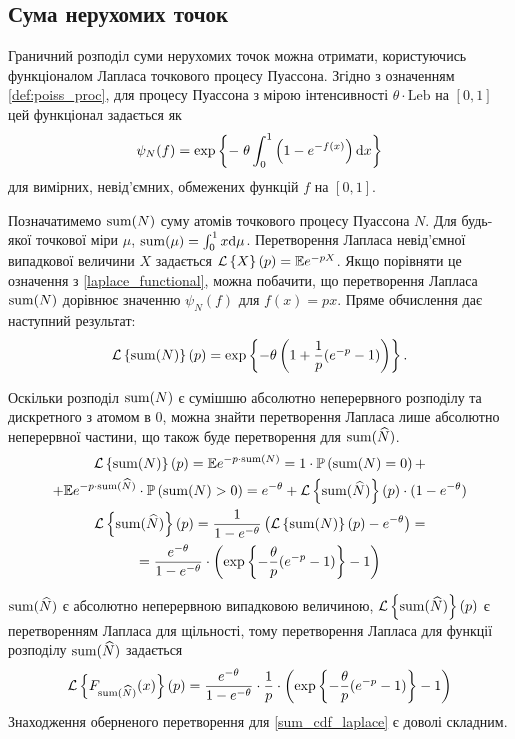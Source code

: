 \subsection{Сума нерухомих точок}
Граничний розподіл суми нерухомих точок можна отримати, користуючись функціоналом Лапласа точкового процесу Пуассона.
Згідно з означенням \ref{def:poiss_proc}, для процесу Пуассона з мірою інтенсивності 
$\theta \cdot \mathrm{Leb}$ на $[0, 1]$ цей функціонал задається як
\begin{equation}\label{laplace_functional}
    \psi_N(f) = \exp\left\{ - \; \theta \int_0^1 \left(1 - e^{-f(x)}\right) \mathrm{d} x\right\}
\end{equation}
для вимірних, невід'ємних, обмежених функцій $f$ на $[0, 1]$.

Позначатимемо $\operatorname{sum}(N)$ суму атомів точкового процесу Пуассона $N$. 
Для будь-якої точкової міри $\mu$, 
$\operatorname{sum}(\mu) = \int_0^1 x \mathrm{d}\mu$. 
Перетворення Лапласа невід'ємної випадкової величини $X$ задається
$\mathcal{L}\left\{X\right\}(p) = \mathbb{E} e^{-pX}$. 
Якщо порівняти це означення з \eqref{laplace_functional}, можна побачити, що
перетворення Лапласа $\operatorname{sum}(N)$ дорівнює значенню $\psi_N(f)$ для $f(x) = px$.
Пряме обчислення дає наступний результат:
\begin{gather}\label{laplace_of_sum}
    \mathcal{L}\left\{\operatorname{sum}(N)\right\}(p) = 
    \exp\left\{- \theta \left( 1 + \frac{1}{p}(e^{-p} - 1)\right) \right\}.
\end{gather}

Оскільки розподіл $\operatorname{sum}(N)$ є сумішшю абсолютно неперервного розподілу та
дискретного з атомом в 0, можна знайти перетворення Лапласа
лише абсолютно неперервної частини, що також буде перетворення для
$\operatorname{sum}(\widehat{N})$.
\begin{gather}
    \mathcal{L}\left\{\operatorname{sum}(N)\right\}(p) = \mathbb{E} e^{-p\cdot\operatorname{sum}(N)} = 
    1 \cdot \mathbb{P}\left(\operatorname{sum}(N) = 0\right) + \nonumber \\ +
    \mathbb{E} e^{-p\cdot\operatorname{sum}(\widehat{N})} \cdot \mathbb{P}\left(\operatorname{sum}(N) > 0\right) =
    e^{-\theta} + \mathcal{L}\left\{\operatorname{sum}(\widehat{N})\right\}(p) \cdot (1-e^{-\theta})
    \nonumber \\
    \mathcal{L}\left\{\operatorname{sum}(\widehat{N})\right\}(p) = \frac{1}{1 - e^{-\theta}}
    \left(\mathcal{L}\left\{\operatorname{sum}(N)\right\}(p) - e^{-\theta}\right) = \nonumber \\ =
    \label{laplace_of_sum_cont}
    \frac{e^{-\theta}}{1 - e^{-\theta}} \cdot 
    \left(\exp\left\{- \frac{\theta}{p}(e^{-p} - 1) \right\} - 1\right)
\end{gather}

$\operatorname{sum}(\widehat{N})$ є абсолютно неперервною випадковою величиною,
$\mathcal{L}\left\{\operatorname{sum}(\widehat{N})\right\}(p)$ є перетворенням Лапласа для щільності, тому
перетворення Лапласа для функції розподілу $\operatorname{sum}(\widehat{N})$
задається 
\begin{equation}\label{sum_cdf_laplace}
    \mathcal{L}\left\{F_{\operatorname{sum}(\widehat{N})}(x)\right\}(p) = 
    \frac{e^{-\theta}}{1 - e^{-\theta}} \cdot \frac{1}{p} \cdot
    \left(\exp\left\{- \frac{\theta}{p}(e^{-p} - 1) \right\} - 1\right)
\end{equation}
Знаходження оберненого перетворення для \eqref{sum_cdf_laplace}
є доволі складним.

